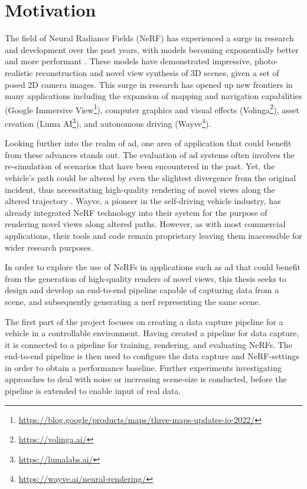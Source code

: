 \section{Motivation}
The field of Neural Radiance Fields (NeRF) has experienced a surge in research and development over the past years, with models becoming exponentially better and more performant \cite{debbagh_neural_2023}. These models have demonstrated impressive, photo-realistic reconstruction and novel view synthesis of 3D scenes, given a set of posed 2D camera images. This surge in research has opened up new frontiers in many applications including the expansion of mapping and navigation capabilities (Google Immersive View\footnote{\url{https://blog.google/products/maps/three-maps-updates-io-2022/}}), computer graphics and visual effects (Volinga\footnote{\url{https://volinga.ai/}}), asset creation (Luma AI\footnote{\url{https://lumalabs.ai/}}), and autonomous driving (Wayve\footnote{\url{https://wayve.ai/neural-rendering/}}). 

Looking further into the realm of \acrshort{ad}, one area of application that could benefit from these advances stands out. The evaluation of \acrshort{ad} systems often involves the re-simulation of scenarios that have been encountered in the past. Yet, the vehicle's path could be altered by even the slightest divergence from the original incident, thus necessitating high-quality rendering of novel views along the altered trajectory \cite{tancik_block-nerf_2022}. Wayve, a pioneer in the self-driving vehicle industry, has already integrated NeRF technology into their system for the purpose of rendering novel views along altered paths. However, as with most commercial applications, their tools and code remain proprietary leaving them inaccessible for wider research purposes.

In order to explore the use of NeRFs in applications such as \acrshort{ad} that could benefit from the generation of high-quality renders of novel views, this thesis seeks to design and develop an end-to-end pipeline capable of capturing data from a scene, and subsequently generating a \acrshort{nerf} representing the same scene. 

The first part of the project focuses on creating a data capture pipeline for a vehicle in a controllable environment. Having created a pipeline for data capture, it is connected to a pipeline for training, rendering, and evaluating NeRFs. The end-to-end pipeline is then used to configure the data capture and NeRF-settings in order to obtain a performance baseline. Further experiments investigating approaches to deal with noise or increasing scene-size is conducted, before the pipeline is extended to enable input of real data.

